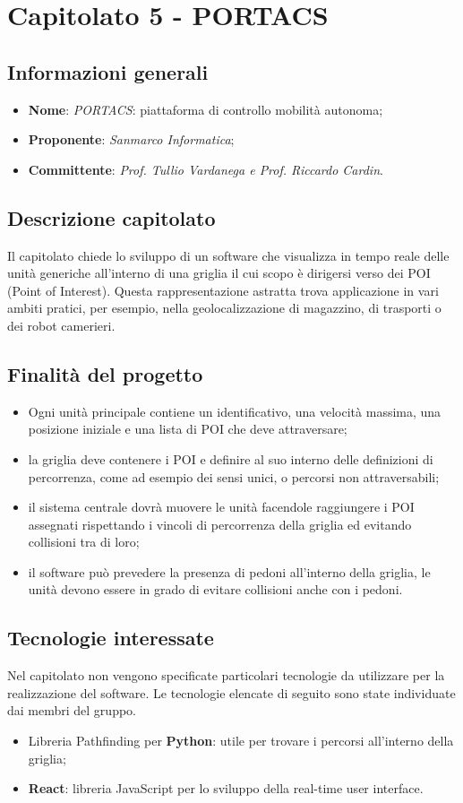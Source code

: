 \section{Capitolato 5 - PORTACS}
\subsection{Informazioni generali}
\begin{itemize}
    \item \textbf{Nome}: \emph{PORTACS}: piattaforma di controllo mobilità autonoma;
    \item \textbf{Proponente}: \emph{Sanmarco Informatica};
    \item \textbf{Committente}: \emph{Prof. Tullio Vardanega e Prof. Riccardo Cardin}.
\end{itemize}
\subsection{Descrizione capitolato}
Il capitolato chiede lo sviluppo di un software che visualizza in tempo reale delle unità generiche all'interno di una griglia il cui scopo è dirigersi verso dei POI (Point of Interest). Questa rappresentazione astratta trova applicazione in vari ambiti pratici, per esempio, nella geolocalizzazione di magazzino, di trasporti o dei robot camerieri.
\subsection{Finalità del progetto}
\begin{itemize}
    \item Ogni unità principale contiene un identificativo, una velocità massima, una posizione iniziale e una lista di POI che deve attraversare;
    \item la griglia deve contenere i POI e definire al suo interno delle definizioni di percorrenza, come ad esempio dei sensi unici, o percorsi non attraversabili;
    \item il sistema centrale dovrà muovere le unità facendole raggiungere i POI assegnati rispettando i vincoli di percorrenza della griglia ed evitando collisioni tra di loro;
    \item il software può prevedere la presenza di pedoni all'interno della griglia, le unità devono essere in grado di evitare collisioni anche con i pedoni.
\end{itemize}
\subsection{Tecnologie interessate}
Nel capitolato non vengono specificate particolari tecnologie da utilizzare per la realizzazione del software. Le tecnologie elencate di seguito sono state individuate dai membri del gruppo.
\begin{itemize}
    \item Libreria Pathfinding per \textbf{Python}: utile per trovare i percorsi all’interno della griglia;
    \item \textbf{React}: libreria JavaScript per lo sviluppo della real-time user interface.
\end{itemize}
